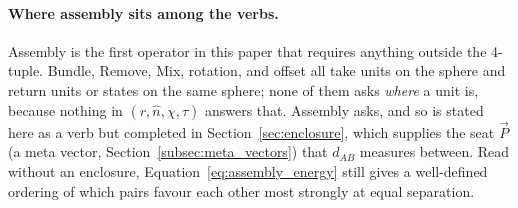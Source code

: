 \documentclass[12pt, a4paper]{article}
\begin{document}
\paragraph{Where assembly sits among the verbs.}
Assembly is the first operator in this paper that requires anything
outside the 4-tuple. Bundle, Remove, Mix, rotation, and offset all
take units on the sphere and return units or states on the same
sphere; none of them asks \emph{where} a unit is, because nothing in
$(r,\hat n,\chi,\tau)$ answers that. Assembly asks, and so is stated
here as a verb but completed in Section~\ref{sec:enclosure}, which
supplies the seat $\vec P$ (a meta vector, Section~\ref{subsec:meta_vectors})
that $d_{AB}$ measures between. Read
without an enclosure, Equation~\eqref{eq:assembly_energy} still
gives a well-defined ordering of which pairs favour each other most
strongly at equal separation.
\end{document}
